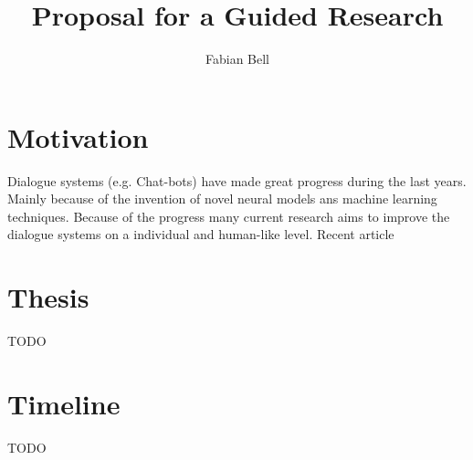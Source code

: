 \documentclass[11pt]{article}
\title{Proposal for a Guided Research}
\author{Fabian Bell}
\date
\begin{document}
\maketitle
\section{Motivation}
Dialogue systems (e.g. Chat-bots) have made great progress during the last years. Mainly because of the invention of novel neural models ans machine learning techniques. Because of the progress many current research aims to improve the dialogue systems on a individual and human-like level. Recent article \cite{DBLP:journals/corr/abs-1901-08149}
\section{Thesis}
TODO
\section{Timeline}
TODO



\end{document}
